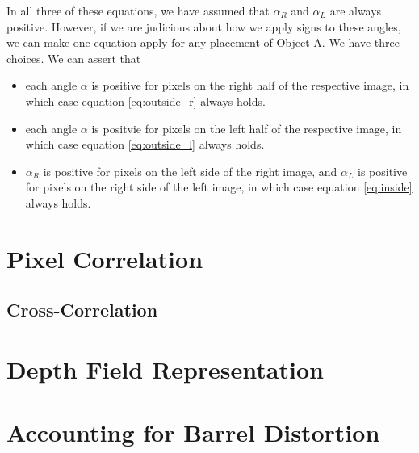 \documentclass{article}
\begin{document}
In all three of these equations, we have assumed that $\alpha_R$ and $\alpha_L$ are always positive.
However, if we are judicious about how we apply signs to these angles, we can make one equation apply for any placement of Object A.
We have three choices. 
We can assert that 

\begin{itemize}
    \item each angle $\alpha$ is positive for pixels on the right half of the respective image, in which case equation \ref{eq:outside_r} always holds.
    \item each angle $\alpha$ is positvie for pixels on the left half of the respective image, in which case equation \ref{eq:outside_l} always holds.
    \item $\alpha_R$ is positive for pixels on the left side of the right image, and $\alpha_L$ is positive for pixels on the right side of the left image, in which case equation \ref{eq:inside} always holds. 
\end{itemize}

\section{Pixel Correlation}

\begin{figure}
    \centering
\end{figure}

    \subsection{Cross-Correlation}

\section{Depth Field Representation}

\section{Accounting for Barrel Distortion}
\end{document}
